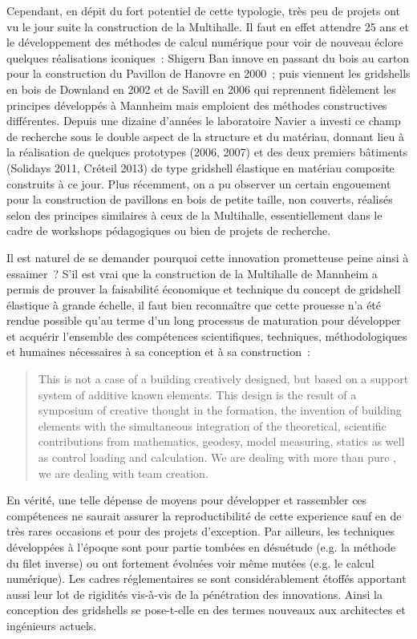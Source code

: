 Cependant, en dépit du fort potentiel de cette typologie, très peu de projets ont vu le jour suite la construction de la Multihalle. Il faut en effet attendre 25 ans et le développement des méthodes de calcul numérique pour voir de nouveau éclore quelques réalisations iconiques~: Shigeru Ban innove en passant du bois au carton pour la construction du Pavillon de Hanovre en 2000~; puis viennent les gridshells en bois de Downland en 2002 et de Savill en 2006 qui reprennent fidèlement les principes développés à Mannheim mais emploient des méthodes constructives différentes. Depuis une dizaine d'années le laboratoire Navier a investi ce champ de recherche sous le double aspect de la structure et du matériau, donnant lieu à la réalisation de quelques prototypes (2006, 2007) et des deux premiers bâtiments (Solidays 2011, Créteil 2013) de type gridshell élastique en matériau composite construits à ce jour. Plus récemment, on a pu observer un certain engouement pour la construction de pavillons en bois de petite taille, non couverts, réalisés selon des principes similaires à ceux de la Multihalle, essentiellement dans le cadre de workshops pédagogiques ou bien de projets de recherche.

Il est naturel de se demander pourquoi cette innovation prometteuse peine ainsi à essaimer~? S'il est vrai que la construction de la Multihalle de Mannheim a permis de prouver la faisabilité économique et technique du concept de gridshell élastique à grande échelle, il faut bien reconnaître que cette prouesse n'a été rendue possible qu'au terme d'un long processus de maturation pour développer et acquérir l'ensemble des compétences scientifiques, techniques, méthodologiques et humaines nécessaires à sa conception et à sa construction~: \blockcquote[Georg Lewenton][p.~201]{IL13}{This is not a case of a building creatively designed, but based on a support system of additive known elements. This design is the result of a symposium of creative thought in the formation, the invention of building elements with the simultaneous integration of the theoretical, scientific contributions from mathematics, geodesy, model measuring, statics as well as control loading and calculation. We are dealing with more than pure , we are dealing with team creation.}

En vérité, une telle dépense de moyens pour développer et rassembler ces compétences ne saurait assurer la reproductibilité de cette experience sauf en de très rares occasions et pour des projets d'exception. Par ailleurs, les techniques développées à l'époque sont pour partie tombées en désuétude (e.g. la méthode du filet inverse) ou ont fortement évoluées voir même mutées (e.g. le calcul numérique). Les cadres réglementaires se sont considérablement étoffés apportant aussi leur lot de rigidités vis-à-vis de la pénétration des innovations. Ainsi la conception des gridshells se pose-t-elle en des termes nouveaux aux architectes et ingénieurs actuels.

